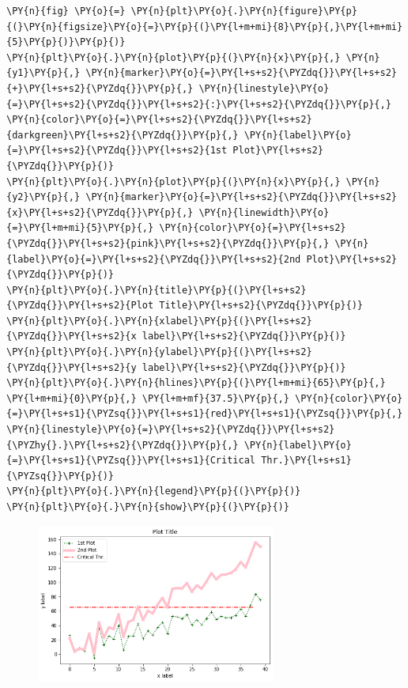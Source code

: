 \begin{tcolorbox}[breakable, size=fbox, boxrule=1pt, pad at break*=1mm,colback=cellbackground, colframe=cellborder]
\begin{Verbatim}[commandchars=\\\{\}]
\PY{n}{fig} \PY{o}{=} \PY{n}{plt}\PY{o}{.}\PY{n}{figure}\PY{p}{(}\PY{n}{figsize}\PY{o}{=}\PY{p}{(}\PY{l+m+mi}{8}\PY{p}{,}\PY{l+m+mi}{5}\PY{p}{)}\PY{p}{)}
\PY{n}{plt}\PY{o}{.}\PY{n}{plot}\PY{p}{(}\PY{n}{x}\PY{p}{,} \PY{n}{y1}\PY{p}{,} \PY{n}{marker}\PY{o}{=}\PY{l+s+s2}{\PYZdq{}}\PY{l+s+s2}{+}\PY{l+s+s2}{\PYZdq{}}\PY{p}{,} \PY{n}{linestyle}\PY{o}{=}\PY{l+s+s2}{\PYZdq{}}\PY{l+s+s2}{:}\PY{l+s+s2}{\PYZdq{}}\PY{p}{,} \PY{n}{color}\PY{o}{=}\PY{l+s+s2}{\PYZdq{}}\PY{l+s+s2}{darkgreen}\PY{l+s+s2}{\PYZdq{}}\PY{p}{,} \PY{n}{label}\PY{o}{=}\PY{l+s+s2}{\PYZdq{}}\PY{l+s+s2}{1st Plot}\PY{l+s+s2}{\PYZdq{}}\PY{p}{)}
\PY{n}{plt}\PY{o}{.}\PY{n}{plot}\PY{p}{(}\PY{n}{x}\PY{p}{,} \PY{n}{y2}\PY{p}{,} \PY{n}{marker}\PY{o}{=}\PY{l+s+s2}{\PYZdq{}}\PY{l+s+s2}{x}\PY{l+s+s2}{\PYZdq{}}\PY{p}{,} \PY{n}{linewidth}\PY{o}{=}\PY{l+m+mi}{5}\PY{p}{,} \PY{n}{color}\PY{o}{=}\PY{l+s+s2}{\PYZdq{}}\PY{l+s+s2}{pink}\PY{l+s+s2}{\PYZdq{}}\PY{p}{,} \PY{n}{label}\PY{o}{=}\PY{l+s+s2}{\PYZdq{}}\PY{l+s+s2}{2nd Plot}\PY{l+s+s2}{\PYZdq{}}\PY{p}{)}
\PY{n}{plt}\PY{o}{.}\PY{n}{title}\PY{p}{(}\PY{l+s+s2}{\PYZdq{}}\PY{l+s+s2}{Plot Title}\PY{l+s+s2}{\PYZdq{}}\PY{p}{)}
\PY{n}{plt}\PY{o}{.}\PY{n}{xlabel}\PY{p}{(}\PY{l+s+s2}{\PYZdq{}}\PY{l+s+s2}{x label}\PY{l+s+s2}{\PYZdq{}}\PY{p}{)}
\PY{n}{plt}\PY{o}{.}\PY{n}{ylabel}\PY{p}{(}\PY{l+s+s2}{\PYZdq{}}\PY{l+s+s2}{y label}\PY{l+s+s2}{\PYZdq{}}\PY{p}{)}
\PY{n}{plt}\PY{o}{.}\PY{n}{hlines}\PY{p}{(}\PY{l+m+mi}{65}\PY{p}{,} \PY{l+m+mi}{0}\PY{p}{,} \PY{l+m+mf}{37.5}\PY{p}{,} \PY{n}{color}\PY{o}{=}\PY{l+s+s1}{\PYZsq{}}\PY{l+s+s1}{red}\PY{l+s+s1}{\PYZsq{}}\PY{p}{,} \PY{n}{linestyle}\PY{o}{=}\PY{l+s+s2}{\PYZdq{}}\PY{l+s+s2}{\PYZhy{}.}\PY{l+s+s2}{\PYZdq{}}\PY{p}{,} \PY{n}{label}\PY{o}{=}\PY{l+s+s1}{\PYZsq{}}\PY{l+s+s1}{Critical Thr.}\PY{l+s+s1}{\PYZsq{}}\PY{p}{)}
\PY{n}{plt}\PY{o}{.}\PY{n}{legend}\PY{p}{(}\PY{p}{)}
\PY{n}{plt}\PY{o}{.}\PY{n}{show}\PY{p}{(}\PY{p}{)}
\end{Verbatim}
\end{tcolorbox}

\begin{figure}[h]
	\centering
	\includegraphics[width=0.7\textwidth]{figures/matplotlib_29_0.png}
\end{figure}

